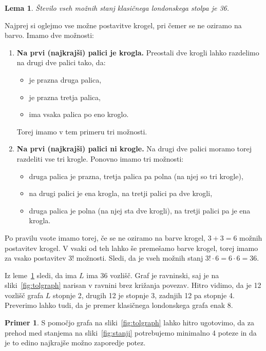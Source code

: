 \documentclass[12pt,a4paper]{amsart}
\theoremstyle{definition} %
\newtheorem{primer}[definicija]{Primer}
\theoremstyle{plain} %
\newtheorem{lema}[definicija]{Lema}
\begin{document}
\begin{lema}
    \label{lem:stanja-klas-lond}
    Število vseh možnih stanj klasičnega londonskega stolpa je 36.
\end{lema}

\proof
    Najprej si oglejmo vse možne postavitve krogel, pri čemer se ne oziramo na barvo.
    Imamo dve možnosti:
    \begin{enumerate}
        \item \textbf{Na prvi (najkrajši) palici je krogla.}
        Preostali dve krogli lahko razdelimo na drugi dve palici tako, da:
        \begin{itemize}[label={-}]
            \item je prazna druga palica,
            \item je prazna tretja palica,
            \item ima vsaka palica po eno kroglo.
        \end{itemize}
        Torej imamo v tem primeru tri možnosti.
        
        \item \textbf{Na prvi (najkrajši) palici ni krogle.}
        Na drugi dve palici moramo torej razdeliti vse tri krogle.
        Ponovno imamo tri možnosti:
        \begin{itemize}[label={-}]
            \item druga palica je prazna, tretja palica pa polna (na njej so tri krogle),
            \item na drugi palici je ena krogla, na tretji palici pa dve krogli,
            \item druga palica je polna (na njej sta dve krogli), na tretji palici pa je ena krogla.
        \end{itemize}
    \end{enumerate}
    Po pravilu vsote imamo torej, če se ne oziramo na barve krogel, $3+3=6$ možnih postavitev krogel.
    V vsaki od teh lahko še premešamo barve krogel, torej imamo za vsako postavitev $3!$ možnosti. Sledi, da je vseh možnih stanj $3! \cdot 6 = 6 \cdot 6 = 36$.\qedhere
\endproof

Iz leme~\ref{lem:stanja-klas-lond} sledi, da ima $L$ ima 36 vozlišč. Graf je ravninski, saj je na sliki~\ref{fig:tolgraph} narisan v ravnini brez križanja povezav. Hitro vidimo, da je 12 vozlišč grafa $L$ stopnje 2, drugih 12 je stopnje 3, zadnjih 12 pa stopnje 4. Preverimo lahko tudi, da je premer klasičnega londonskega grafa enak 8.

\begin{primer}
    S pomočjo grafa na sliki~\ref{fig:tolgraph} lahko hitro ugotovimo, da za prehod med stanjema na sliki~\ref{fig:stanji} potrebujemo minimalno 4 poteze in da je to edino najkrajše možno zaporedje potez.
\end{primer}
\end{document}
